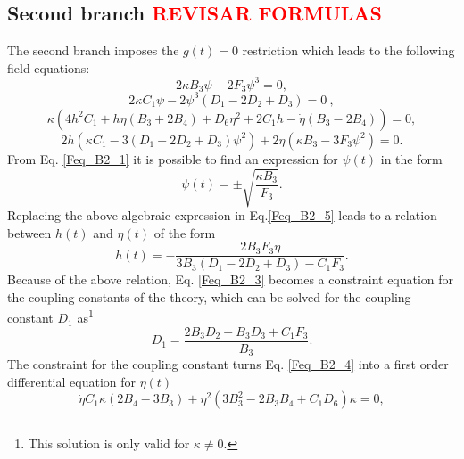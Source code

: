 \subsection{Second branch \textcolor{red}{REVISAR FORMULAS}}

The second branch imposes the $g(t) = 0$ restriction which leads to the following field equations:
\begin{dmath}
    \label{Feq_B2_1}
    2\kappa B_3 \psi - 2F_3\psi^3= 0,
\end{dmath}
\begin{dmath}
    \label{Feq_B2_3}
    2\kappa C_1\psi - 2\psi^3 \left(D_1 - 2D_2 + D_3\right) = 0 \ ,
\end{dmath}
\begin{dmath}
    \label{Feq_B2_4}
    \kappa\left(4h^2C_1 + h\eta\left(B_3 + 2B_4\right) + D_6\eta^2 + 2C_1\dot{h} - \dot{\eta}\left(B_3 - 2B_4\right)\right) = 0,
\end{dmath}
\begin{dmath}
    \label{Feq_B2_5}
    2h \left(\kappa C_1 - 3\left(D_1 - 2D_2 + D_3\right) \psi^2\right) + 2\eta\left(\kappa B_3 - 3F_3\psi^2\right) = 0.
\end{dmath}
From Eq. \eqref{Feq_B2_1} it is possible to find an expression for $\psi(t)$ in the form
\begin{equation}
    \psi(t) = \pm \sqrt{\frac{\kappa B_3}{F_3}} .
\end{equation}
Replacing the above algebraic expression in Eq.\eqref{Feq_B2_5} leads to a relation between $h(t)$ and $\eta(t)$ of the form
\begin{equation}
    h(t) = - \frac{2B_3F_3 \eta}{3B_3 \left(D_1 - 2D_2 + D_3\right) - C_1F_3}.
\end{equation}
Because of the above relation, Eq. \eqref{Feq_B2_3} becomes a constraint equation for the coupling constants of the theory,
which can be solved for the coupling constant $D_1$ as\footnote{This solution is only valid for $\kappa \neq 0$.}
\begin{equation}
    \label{B2_k_constraint_1}
	 D_1 = \frac{2B_3D_2 - B_3D_3 + C_1F_3}{B_3}.
\end{equation} 
The constraint for the coupling constant turns Eq. \eqref{Feq_B2_4} into a first order differential equation for $\eta(t)$
\begin{equation}
    \label{B2_k_constraint_2}
    \dot{\eta}C_1 \kappa \left(2B_4 - 3B_3\right) + \eta^2 \left(3B_3^2 - 2B_3 B_4 + C_1D_6\right)\kappa = 0,
\end{equation}
